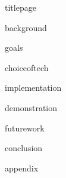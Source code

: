 \documentclass[12pt]{article}
\begin{document}
\doublespacing

{titlepage}

{background}

{goals}

{choiceoftech}

{implementation}

{demonstration}

{futurework}

{conclusion}

{appendix}
\end{document}
